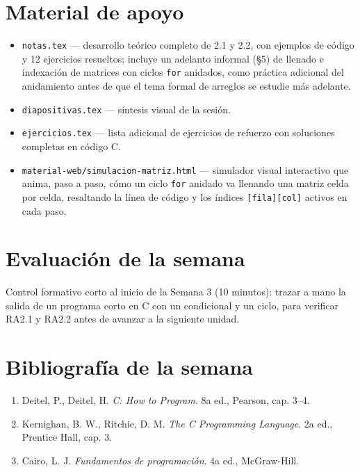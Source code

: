 \documentclass[11pt,letterpaper]{article}
\begin{document}
\section{Material de apoyo}

\begin{itemize}[leftmargin=1.2cm]
  \item \texttt{notas.tex} --- desarrollo teórico completo de 2.1 y 2.2, con ejemplos de código y
        12 ejercicios resueltos; incluye un adelanto informal (§5) de llenado e indexación de
        matrices con ciclos \texttt{for} anidados, como práctica adicional del anidamiento antes de
        que el tema formal de arreglos se estudie más adelante.
  \item \texttt{diapositivas.tex} --- síntesis visual de la sesión.
  \item \texttt{ejercicios.tex} --- lista adicional de ejercicios de refuerzo con soluciones
        completas en código C.
  \item \texttt{material-web/simulacion-matriz.html} --- simulador visual interactivo que anima,
        paso a paso, cómo un ciclo \texttt{for} anidado va llenando una matriz celda por celda,
        resaltando la línea de código y los índices \texttt{[fila][col]} activos en cada paso.
\end{itemize}

\section{Evaluación de la semana}

Control formativo corto al inicio de la Semana 3 (10 minutos): trazar a mano la salida de un
programa corto en C con un condicional y un ciclo, para verificar RA2.1 y RA2.2 antes de avanzar a
la siguiente unidad.

\section{Bibliografía de la semana}

\begin{enumerate}[leftmargin=1.2cm]
  \item Deitel, P., Deitel, H. \emph{C: How to Program}. 8a ed., Pearson, cap. 3--4.
  \item Kernighan, B. W., Ritchie, D. M. \emph{The C Programming Language}. 2a ed., Prentice Hall,
        cap. 3.
  \item Cairo, L. J. \emph{Fundamentos de programación}. 4a ed., McGraw-Hill.
\end{enumerate}
\end{document}
